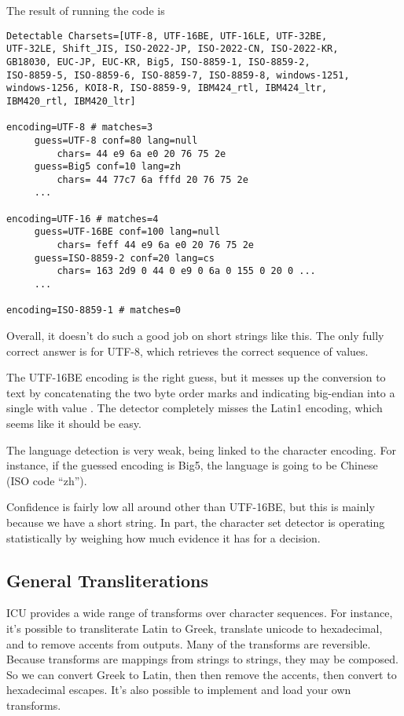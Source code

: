 The result of running the code is
%
\begin{verbatim}
Detectable Charsets=[UTF-8, UTF-16BE, UTF-16LE, UTF-32BE, 
UTF-32LE, Shift_JIS, ISO-2022-JP, ISO-2022-CN, ISO-2022-KR, 
GB18030, EUC-JP, EUC-KR, Big5, ISO-8859-1, ISO-8859-2, 
ISO-8859-5, ISO-8859-6, ISO-8859-7, ISO-8859-8, windows-1251, 
windows-1256, KOI8-R, ISO-8859-9, IBM424_rtl, IBM424_ltr, 
IBM420_rtl, IBM420_ltr]

encoding=UTF-8 # matches=3
     guess=UTF-8 conf=80 lang=null
         chars= 44 e9 6a e0 20 76 75 2e
     guess=Big5 conf=10 lang=zh
         chars= 44 77c7 6a fffd 20 76 75 2e
     ...

encoding=UTF-16 # matches=4
     guess=UTF-16BE conf=100 lang=null
         chars= feff 44 e9 6a e0 20 76 75 2e
     guess=ISO-8859-2 conf=20 lang=cs
         chars= 163 2d9 0 44 0 e9 0 6a 0 155 0 20 0 ...
     ...

encoding=ISO-8859-1 # matches=0
\end{verbatim}
%
Overall, it doesn't do such a good job on short strings like this.
The only fully correct answer is for UTF-8, which retrieves
the correct sequence of  values.

The UTF-16BE encoding is the right guess, but it messes up the
conversion to text by concatenating the two byte order marks 
and  indicating big-endian into a single  with value
.  The detector completely misses the Latin1 encoding, which
seems like it should be easy.    

The language detection is very weak, being linked to the character
encoding.  For instance, if the guessed encoding is Big5, the language
is going to be Chinese (ISO code ``zh'').

Confidence is fairly low all around other than UTF-16BE, but
this is mainly because we have a short string.  In part, the
character set detector is operating statistically by weighing how
much evidence it has for a decision.



\subsection{General Transliterations}\label{section:char-unicode-transliterate}

ICU provides a wide range of transforms over character sequences.  For
instance, it's possible to transliterate Latin to Greek, translate
unicode to hexadecimal, and to remove accents from outputs.  Many of
the transforms are reversible.  Because transforms are mappings from
strings to strings, they may be composed.  So we can convert Greek to
Latin, then then remove the accents, then convert to hexadecimal
escapes.  It's also possible to implement and load your own transforms.

